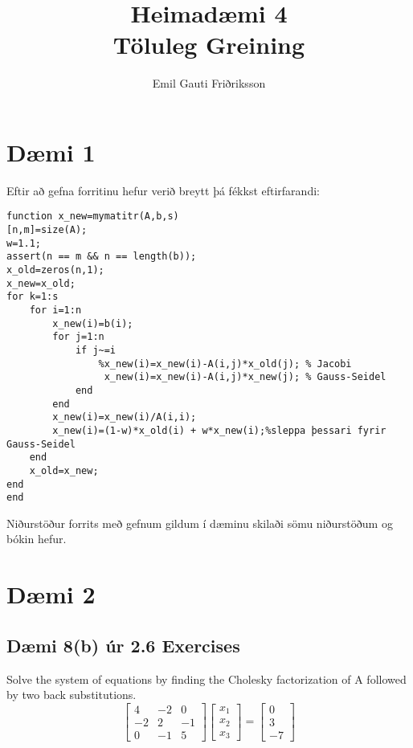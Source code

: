 \documentclass[11pt]{article}
\title{Heimadæmi 4\\ \vspace{0.4cm} \large Töluleg Greining}
\author{Emil Gauti Friðriksson}
\begin{document}
\maketitle
\section*{Dæmi 1}
Eftir að gefna forritinu hefur verið breytt þá fékkst eftirfarandi:
\begin{verbatim}
function x_new=mymatitr(A,b,s)
[n,m]=size(A);
w=1.1;
assert(n == m && n == length(b));
x_old=zeros(n,1);
x_new=x_old;
for k=1:s
    for i=1:n
        x_new(i)=b(i);
        for j=1:n
            if j~=i
                %x_new(i)=x_new(i)-A(i,j)*x_old(j); % Jacobi
                 x_new(i)=x_new(i)-A(i,j)*x_new(j); % Gauss-Seidel
            end
        end
        x_new(i)=x_new(i)/A(i,i);
        x_new(i)=(1-w)*x_old(i) + w*x_new(i);%sleppa þessari fyrir Gauss-Seidel        
    end
    x_old=x_new;
end
end
\end{verbatim}
Niðurstöður forrits með gefnum gildum í dæminu skilaði sömu niðurstöðum og bókin hefur.

\newpage
\section*{Dæmi 2}
\subsection*{Dæmi 8(b) úr 2.6 Exercises}
Solve the system of equations by finding the Cholesky factorization of A followed by two back
substitutions.
$$
\begin{bmatrix}
4 & -2 & 0\\
-2 & 2 & -1\\
0 & -1 & 5
\end{bmatrix}
\begin{bmatrix}
x_1\\
x_2\\
x_3
\end{bmatrix}
=
\begin{bmatrix}
0\\
3\\
-7
\end{bmatrix}
$$
\end{document}
